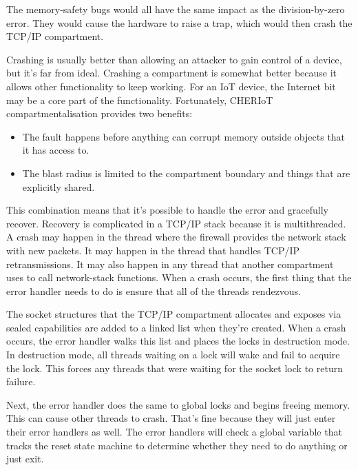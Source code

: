 {The memory-safety bugs would all have the same impact as the division-by-zero error.
They would cause the hardware to raise a trap, which would then crash the TCP/IP compartment.

Crashing is usually better than allowing an attacker to gain control of a device, but it's far from ideal.
Crashing a compartment is somewhat better because it allows other functionality to keep working.
For an IoT device, the Internet bit may be a core part of the functionality.
Fortunately, CHERIoT compartmentalisation provides two benefits:

\begin{itemize}
	\item{The fault happens before anything can corrupt memory outside objects that it has access to.}
	\item{The blast radius is limited to the compartment boundary and things that are explicitly shared.}
\end{itemize}

This combination means that it's possible to handle the error and gracefully recover.
Recovery is complicated in a TCP/IP stack because it is multithreaded.
A crash may happen in the thread where the firewall provides the network stack with new packets.
It may happen in the thread that handles TCP/IP retransmissions.
It may also happen in any thread that another compartment uses to call network-stack functions.
When a crash occurs, the first thing that the error handler needs to do is ensure that all of the threads rendezvous.

The socket structures that the TCP/IP compartment allocates and exposes via sealed capabilities are added to a linked list when they're created.
When a crash occurs, the error handler walks this list and places the locks in destruction mode.
In destruction mode, all threads waiting on a lock will wake and fail to acquire the lock.
This forces any threads that were waiting for the socket lock to return failure.

Next, the error handler does the same to global locks and begins freeing memory.
This can cause other threads to crash.
That's fine because they will just enter their error handlers as well.
The error handlers will check a global variable that tracks the reset state machine to determine whether they need to do anything or just exit.

}
